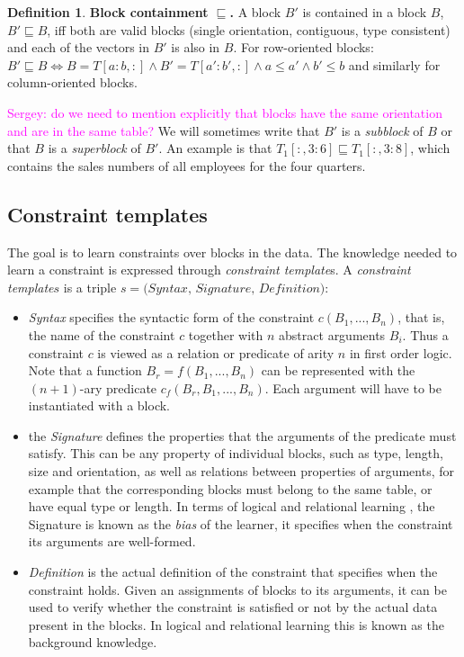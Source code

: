 \documentclass{IEEEtran}
\newcommand{\sergey}[1]{\textcolor{magenta}{{\sc Sergey:} #1}\xspace}
\newcommand{\format}[1]{\textit{#1}\xspace}
\newcommand{\template}{\format{constraint template}}
\newcommand{\CName}{Syntax\xspace}
\newcommand{\CSignature}{Signature\xspace}
\newcommand{\CFunction}{Definition\xspace}
\newcommand{\rangeto}[2]{#1{:}#2}
\theoremstyle{definition}
\newtheorem{definition}{Definition}
\begin{document}
\begin{definition}
\textbf{Block containment $\sqsubseteq$.} 
A block $B'$ is contained in a block $B$, $B' \sqsubseteq B$, iff both are valid blocks (single orientation, contiguous, type consistent) and each of the vectors in $B'$ is also in $B$. For row-oriented blocks: $B' \sqsubseteq B \Leftrightarrow B=T[\rangeto{a}{b},:] \wedge B'=T[\rangeto{a'}{b'},:] \wedge a \leq a' \wedge b' \leq b$ and similarly for column-oriented blocks.
\end{definition}
\sergey{do we need to mention explicitly that blocks have the same orientation and are in the same table?}
We will sometimes write that $B'$ is a \textit{subblock} of $B$ or that $B$ is a \textit{superblock} of $B'$.
%
An example is that $T_1[:,\rangeto{3}{6}] \sqsubseteq T_1[:,\rangeto{3}{8}] $, which contains the sales numbers of all employees for the four quarters.


\subsection{Constraint templates}
The goal is to learn constraints over blocks in the data. The knowledge needed to learn a constraint is expressed through {\template}s.
%
A \template $s$ is a triple $s=\textit{(\CName, \CSignature, \CFunction)}$:
\begin{itemize}
\item
\textit{\CName}  specifies the syntactic form of the constraint $c(B_1, ...,B_n)$, that is, the name of the constraint $c$ together
with $n$ abstract arguments $B_i$. Thus a constraint $c$ is viewed as a relation or predicate of arity $n$ in first order logic. Note that a function $B_r=f(B_1,...,B_n)$ can be represented with the $(n{+}1)$-ary predicate $c_f(B_r,B_1,...,B_n)$. Each argument will have to be instantiated with a block.

\item the \textit{\CSignature} defines the properties that the arguments of the predicate must satisfy. This can be any property of individual blocks, such as type, length, size and orientation, as well as relations between properties of arguments, for example that the corresponding blocks must belong to the same table, or have equal type or length. In terms of logical and relational learning \cite{luc_book}, the \CSignature is known as the {\em bias} of the learner, it specifies when the constraint its arguments are well-formed.

\item \textit{\CFunction} is the actual definition of the constraint that specifies when the constraint holds. Given an assignments of blocks to its arguments, it can be used to verify whether the constraint is satisfied or not by the actual data present in the blocks. %
In logical and relational learning this is known as the background knowledge. %
\end{itemize}
\end{document}
